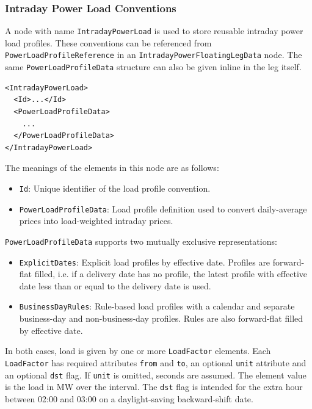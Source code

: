 \subsubsection{Intraday Power Load Conventions}
\label{sss:intraday_power_load_conventions}

A node with name \lstinline!IntradayPowerLoad! is used to store reusable intraday power load profiles. These
conventions can be referenced from \lstinline!PowerLoadProfileReference! in an
\lstinline!IntradayPowerFloatingLegData! node. The same \lstinline!PowerLoadProfileData! structure can also be given
inline in the leg itself.

\begin{listing}[H]
\begin{verbatim}
<IntradayPowerLoad>
  <Id>...</Id>
  <PowerLoadProfileData>
    ...
  </PowerLoadProfileData>
</IntradayPowerLoad>
\end{verbatim}
\caption{Intraday power load conventions}
\label{lst:intraday_power_load_conventions}
\end{listing}

The meanings of the elements in this node are as follows:
\begin{itemize}
\item \lstinline!Id!: Unique identifier of the load profile convention.
\item \lstinline!PowerLoadProfileData!: Load profile definition used to convert daily-average prices into load-weighted intraday prices.
\end{itemize}

\lstinline!PowerLoadProfileData! supports two mutually exclusive representations:
\begin{itemize}
\item \lstinline!ExplicitDates!: Explicit load profiles by effective date. Profiles are forward-flat filled, i.e. if a delivery date has no profile, the latest profile with effective date less than or equal to the delivery date is used.
\item \lstinline!BusinessDayRules!: Rule-based load profiles with a calendar and separate business-day and non-business-day profiles. Rules are also forward-flat filled by effective date.
\end{itemize}

In both cases, load is given by one or more \lstinline!LoadFactor! elements. Each \lstinline!LoadFactor! has required
attributes \lstinline!from! and \lstinline!to!, an optional \lstinline!unit! attribute and an optional
\lstinline!dst! flag. If \lstinline!unit! is omitted, seconds are assumed. The element value is the load in MW over
the interval. The \lstinline!dst! flag is intended for the extra hour between 02:00 and 03:00 on a daylight-saving
backward-shift date.

